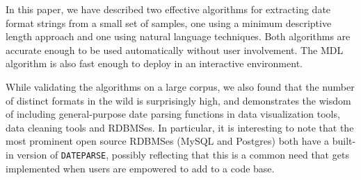 In this paper, we have described two effective algorithms for extracting date format strings from a small set of samples, one using a minimum descriptive length approach and one using natural language techniques. Both algorithms are accurate enough to be used automatically without user involvement. The MDL algorithm is also fast enough to deploy in an interactive environment.

While validating the algorithms on a large corpus, we also found that the number of distinct formats in the wild is surprisingly high, and demonstrates the wisdom of including general-purpose date parsing functions in data visualization tools, data cleaning tools and RDBMSes. In particular, it is interesting to note that the most prominent open source RDBMSes (MySQL and Postgres) both have a built-in version of \texttt{DATEPARSE}, possibly reflecting that this is a common need that gets implemented when users are empowered to add to a code base.
